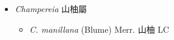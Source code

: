 
  \begin{itemize}
 \item[] \textit{Champereia} 山柚屬
                                
  \begin{itemize}
        \item[] \textit{C. manillana} (Blume) Merr.  山柚   LC
  \end{itemize}
  \end{itemize}
